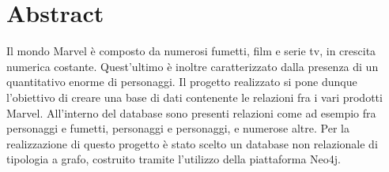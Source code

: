 \documentclass[
12pt, %
a4paper, %
oneside, %
headinclude,footinclude, %
BCOR5mm, %
]{scrartcl}
\title{\normalfont\spacedallcaps{Article Title}} %
\author{\spacedlowsmallcaps{Fabrizio Cominetti, Davide Abete, Ruben Agazzi}} %
\date{} %
\begin{document}

\renewcommand{\sectionmark}[1]{\markright{\spacedlowsmallcaps{#1}}} %
\lehead{\mbox{\llap{\small\thepage\kern1em\color{halfgray} \vline}\color{halfgray}\hspace{0.5em}\rightmark\hfil}} %

\pagestyle{scrheadings} %


\maketitle %

\setcounter{tocdepth}{2} %

\tableofcontents %



\section*{Abstract} %

Il mondo Marvel è composto da numerosi fumetti, film e serie tv, in crescita numerica costante. Quest'ultimo è inoltre caratterizzato dalla presenza di un quantitativo enorme di personaggi.
Il progetto realizzato si pone dunque l'obiettivo di creare una base di dati contenente le relazioni fra i vari prodotti Marvel. All'interno del database sono presenti relazioni come ad esempio fra personaggi e fumetti, personaggi e personaggi, e numerose altre. Per la realizzazione di questo progetto è stato scelto un database non relazionale di tipologia a grafo, costruito tramite l'utilizzo della piattaforma Neo4j.
\end{document}
